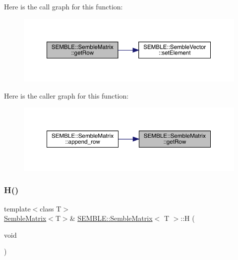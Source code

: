 Here is the call graph for this function\+:
\nopagebreak
\begin{figure}[H]
\begin{center}
\leavevmode
\includegraphics[width=350pt]{df/d87/structSEMBLE_1_1SembleMatrix_aeee188c8f5e6f655d9d4ae52e8ff70b4_cgraph}
\end{center}
\end{figure}
Here is the caller graph for this function\+:
\nopagebreak
\begin{figure}[H]
\begin{center}
\leavevmode
\includegraphics[width=350pt]{df/d87/structSEMBLE_1_1SembleMatrix_aeee188c8f5e6f655d9d4ae52e8ff70b4_icgraph}
\end{center}
\end{figure}
\mbox{\label{structSEMBLE_1_1SembleMatrix_a560e987e3d3151b9d5c31b4bb919983a}} 
\subsubsection{\texorpdfstring{H()}{H()}\hspace{0.1cm}{\footnotesize\ttfamily [1/2]}}
{\footnotesize\ttfamily template$<$class T$>$ \\
\mbox{\hyperlink{structSEMBLE_1_1SembleMatrix}{Semble\+Matrix}}$<$T$>$\& \mbox{\hyperlink{structSEMBLE_1_1SembleMatrix}{S\+E\+M\+B\+L\+E\+::\+Semble\+Matrix}}$<$ T $>$\+::H (\begin{DoxyParamCaption}\item[{void}]{ }\end{DoxyParamCaption})\hspace{0.3cm}{\ttfamily [inline]}}

